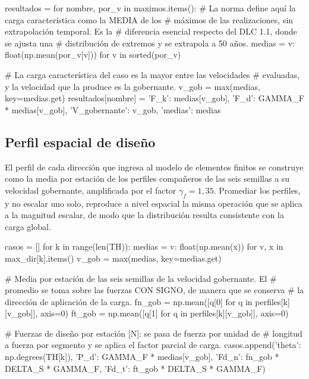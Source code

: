\begin{pycode}
resultados = {}
for nombre, por_v in maximos.items():
    # La norma define aquí la carga característica como la MEDIA de los
    # máximos de las realizaciones, sin extrapolación temporal. Es la
    # diferencia esencial respecto del DLC 1.1, donde se ajusta una
    # distribución de extremos y se extrapola a 50 años.
    medias = {v: float(np.mean(por_v[v])) for v in sorted(por_v)}

    # La carga característica del caso es la mayor entre las velocidades
    # evaluadas, y la velocidad que la produce es la gobernante.
    v_gob = max(medias, key=medias.get)
    resultados[nombre] = {'F_k': medias[v_gob],
                          'F_d': GAMMA_F * medias[v_gob],
                          'V_gobernante': v_gob,
                          'medias': medias}
\end{pycode}

\subsection*{Perfil espacial de diseño}

El perfil de cada dirección que ingresa al modelo de elementos finitos se construye como la media por estación de los perfiles compañeros de las seis semillas a su velocidad gobernante, amplificada por el factor $\gamma_f = 1{,}35$. Promediar los perfiles, y no escalar uno solo, reproduce a nivel espacial la misma operación que se aplica a la magnitud escalar, de modo que la distribución resulta consistente con la carga global.

\begin{pycode}
casos = []
for k in range(len(TH)):
    medias = {v: float(np.mean(x)) for v, x in max_dir[k].items()}
    v_gob = max(medias, key=medias.get)

    # Media por estación de las seis semillas de la velocidad gobernante. El
    # promedio se toma sobre las fuerzas CON SIGNO, de manera que se conserva
    # la dirección de aplicación de la carga.
    fn_gob = np.mean([q[0] for q in perfiles[k][v_gob]], axis=0)
    ft_gob = np.mean([q[1] for q in perfiles[k][v_gob]], axis=0)

    # Fuerzas de diseño por estación [N]: se pasa de fuerza por unidad de
    # longitud a fuerza por segmento y se aplica el factor parcial de carga.
    casos.append({'theta': np.degrees(TH[k]), 'P_d': GAMMA_F * medias[v_gob],
                  'Fd_n': fn_gob * DELTA_S * GAMMA_F,
                  'Fd_t': ft_gob * DELTA_S * GAMMA_F})
\end{pycode}

